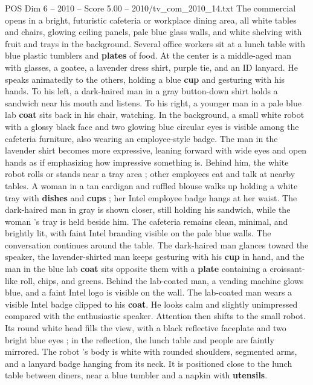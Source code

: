 \begin{textsample}{POS Dim 6 – 2010 – Score 5.00 – 2010/tv\_com\_2010\_14.txt}  \label{ex:f6_pos_088}
The commercial opens in a bright, futuristic cafeteria or workplace dining area, all white tables and chairs, glowing ceiling panels, pale blue glass walls, and white shelving with fruit and trays in the background.
Several office workers sit at a lunch table with blue plastic tumblers and \textbf{plates} of food.
At the center is a middle-aged man with glasses, a goatee, a lavender dress shirt, purple tie, and an ID lanyard.
He speaks animatedly to the others, holding a blue \textbf{cup} and gesturing with his hands.
To his left, a dark-haired man in a gray button-down shirt holds a sandwich near his mouth and listens.
To his right, a younger man in a pale blue lab \textbf{coat} sits back in his chair, watching.
In the background, a small white robot with a glossy black face and two glowing blue circular eyes is visible among the cafeteria furniture, also wearing an employee-style badge.
The man in the lavender shirt becomes more expressive, leaning forward with wide eyes and open hands as if emphasizing how impressive something is.
Behind him, the white robot rolls or stands near a tray area ; other employees eat and talk at nearby tables.
A woman in a tan cardigan and ruffled blouse walks up holding a white tray with \textbf{dishes} and \textbf{cups} ; her Intel employee badge hangs at her waist.
The dark-haired man in gray is shown closer, still holding his sandwich, while the woman ’s tray is held beside him.
The cafeteria remains clean, minimal, and brightly lit, with faint Intel branding visible on the pale blue walls.
The conversation continues around the table.
The dark-haired man glances toward the speaker, the lavender-shirted man keeps gesturing with his \textbf{cup} in hand, and the man in the blue lab \textbf{coat} sits opposite them with a \textbf{plate} containing a croissant-like roll, chips, and greens.
Behind the lab-coated man, a vending machine glows blue, and a faint Intel logo is visible on the wall.
The lab-coated man wears a visible Intel badge clipped to his \textbf{coat}.
He looks calm and slightly unimpressed compared with the enthusiastic speaker.
Attention then shifts to the small robot.
Its round white head fills the view, with a black reflective faceplate and two bright blue eyes ; in the reflection, the lunch table and people are faintly mirrored.
The robot ’s body is white with rounded shoulders, segmented arms, and a lanyard badge hanging from its neck.
It is positioned close to the lunch table between diners, near a blue tumbler and a napkin with \textbf{utensils}.

\end{textsample}
